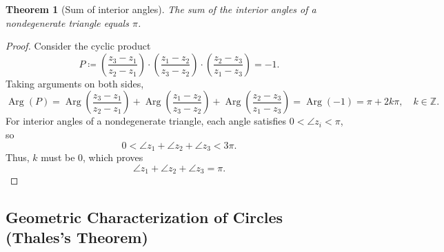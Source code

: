 \documentclass[11pt,a4paper]{article}
\theoremstyle{definition}
\theoremstyle{plain}
\newtheorem{theorem}{Theorem}
\begin{document}
\begin{theorem}[Sum of interior angles]
The sum of the interior angles of a nondegenerate triangle equals $\pi$.
\end{theorem}
\begin{proof}
Consider the cyclic product
\begin{equation}
P \coloneqq \left(\frac{z_3 - z_1}{z_2 - z_1}\right) \cdot \left(\frac{z_1 - z_2}{z_3 - z_2}\right) \cdot \left(\frac{z_2 - z_3}{z_1 - z_3}\right) = -1.
\end{equation}
Taking arguments on both sides,
\begin{equation}
\operatorname{Arg}(P) = \operatorname{Arg}\left(\frac{z_3 - z_1}{z_2 - z_1}\right) + \operatorname{Arg}\left(\frac{z_1 - z_2}{z_3 - z_2}\right) + \operatorname{Arg}\left(\frac{z_2 - z_3}{z_1 - z_3}\right) = \operatorname{Arg}(-1) = \pi + 2k\pi, \quad k \in \mathbb{Z}.
\end{equation}
For interior angles of a nondegenerate triangle, each angle satisfies $0 < \angle z_i < \pi$, so
\begin{equation}
0 < \angle z_1 + \angle z_2 + \angle z_3 < 3\pi.
\end{equation}
Thus, $k$ must be $0$, which proves
\begin{equation}
\angle z_1 + \angle z_2 + \angle z_3 = \pi.
\end{equation}
\end{proof}

\subsection{Geometric Characterization of Circles (Thales's Theorem)}
\end{document}
